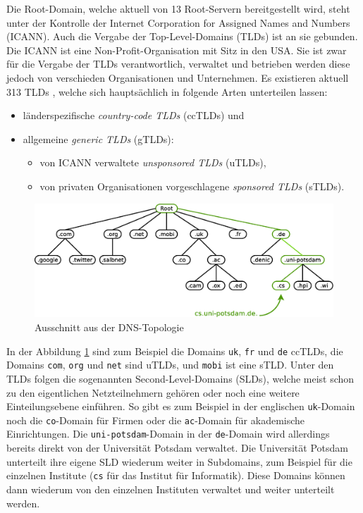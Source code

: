 \documentclass[a4paper, 12pt, BCOR10mm, DIV12, toc=bibliography, toc=listof, german]{scrbook}
\begin{document}
			Die Root-Domain, welche aktuell von 13 Root-Servern \cite{rootserver} bereitgestellt wird,
			steht unter der Kontrolle der Internet Corporation for Assigned Names and Numbers (ICANN). Auch
			die Vergabe der Top-Level-Domains (TLDs) ist an sie gebunden. Die ICANN ist eine
			Non-Profit-Organisation mit Sitz in den USA. Sie ist zwar für die Vergabe der TLDs
			verantwortlich, verwaltet und betrieben werden diese jedoch von verschieden Organisationen und
			Unternehmen. Es existieren aktuell 313 TLDs \cite{tlds}, welche sich hauptsächlich in folgende
			Arten unterteilen lassen:

			\begin{itemize}
				\item länderspezifische \textit{country-code TLDs} (ccTLDs) und
				\item allgemeine \textit{generic TLDs} (gTLDs):
				\begin{itemize}
					\item von ICANN verwaltete \textit{unsponsored TLDs} (uTLDs),
					\item von privaten Organisationen vorgeschlagene \textit{sponsored TLDs} (sTLDs).
				\end{itemize}
			\end{itemize}

			\begin{figure}
				\centering
				\includegraphics[width=\textwidth]{images/dns-tree-domains}
				\caption{Ausschnitt aus der DNS-Topologie}
				\label{fig:dns-tree}
			\end{figure}


			In der Abbildung \ref{fig:dns-tree} sind zum Beispiel die Domains \texttt{uk}, \texttt{fr} und \texttt{de}
			ccTLDs, die Domains \texttt{com}, \texttt{org} und \texttt{net} sind uTLDs, und \texttt{mobi}
			ist eine sTLD. Unter den TLDs folgen die sogenannten Second-Level-Domains (SLDs), welche meist
			schon zu den eigentlichen Netzteilnehmern gehören oder noch eine weitere Einteilungsebene
			einführen. So gibt es zum Beispiel in der englischen \texttt{uk}-Domain noch die
			\texttt{co}-Domain für Firmen oder die \texttt{ac}-Domain für akademische Einrichtungen. Die
			\texttt{uni-potsdam}-Domain in der \texttt{de}-Domain wird allerdings bereits direkt von der
			Universität Potsdam verwaltet. Die Universität Potsdam unterteilt ihre eigene SLD wiederum
			weiter in Subdomains, zum Beispiel für die einzelnen Institute (\texttt{cs} für das Institut
			für Informatik). Diese Domains können dann wiederum von den einzelnen Instituten verwaltet und
			weiter unterteilt werden.
\end{document}
